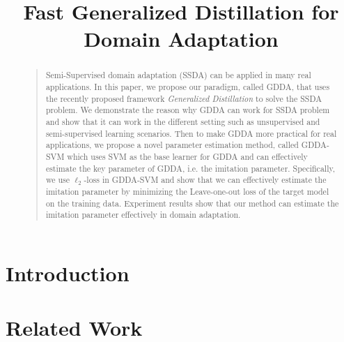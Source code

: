 \documentclass[letterpaper]{article}
\begin{document}
%
\title{Fast Generalized Distillation for Domain Adaptation}
\maketitle
\begin{abstract}
\begin{quote}
Semi-Supervised domain adaptation (SSDA) can be applied in many real applications. In this paper, we propose our paradigm, called GDDA, that uses the recently proposed framework \textit{Generalized Distillation} \cite{lopez2015unifying} to solve the SSDA problem.
We demonstrate the reason why GDDA can work for SSDA problem and show that it can work in the different setting such as unsupervised and semi-supervised learning scenarios. Then to make GDDA more practical for real applications, we propose a novel parameter estimation method, called GDDA-SVM which uses SVM as the base learner for GDDA and can effectively estimate the key parameter of GDDA, i.e. the imitation parameter. Specifically, we use $\ell_2$-loss in GDDA-SVM and show that we can effectively estimate the imitation parameter by minimizing the Leave-one-out loss of the target model on the training data. Experiment results show that our method can estimate the imitation parameter effectively in domain adaptation.
\end{quote}
\end{abstract}

\section{Introduction}


%

%

\section{Related Work}\label{sec:work}

\end{document}
